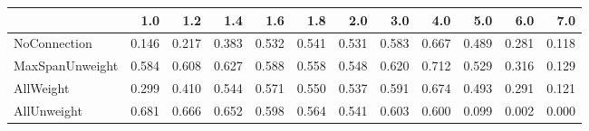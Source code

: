 \begin{tabular}{lrrrrrrrrrrr}
\toprule
{} &   1.0 &   1.2 &   1.4 &   1.6 &   1.8 &   2.0 &   3.0 &   4.0 &   5.0 &   6.0 &   7.0 \\
\midrule
NoConnection    & 0.146 & 0.217 & 0.383 & 0.532 & 0.541 & 0.531 & 0.583 & 0.667 & 0.489 & 0.281 & 0.118 \\
MaxSpanUnweight & 0.584 & 0.608 & 0.627 & 0.588 & 0.558 & 0.548 & 0.620 & 0.712 & 0.529 & 0.316 & 0.129 \\
AllWeight       & 0.299 & 0.410 & 0.544 & 0.571 & 0.550 & 0.537 & 0.591 & 0.674 & 0.493 & 0.291 & 0.121 \\
AllUnweight     & 0.681 & 0.666 & 0.652 & 0.598 & 0.564 & 0.541 & 0.603 & 0.600 & 0.099 & 0.002 & 0.000 \\
\bottomrule
\end{tabular}
